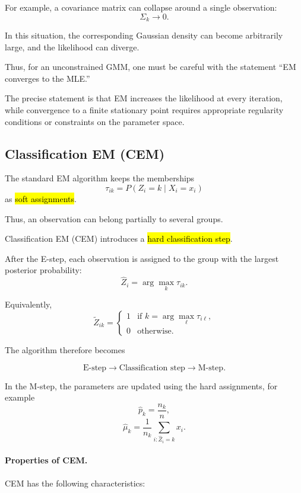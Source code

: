 For example, a covariance matrix can collapse around a single
observation:
\[
\Sigma_k\longrightarrow0.
\]

In this situation, the corresponding Gaussian density can become
arbitrarily large, and the likelihood can diverge.

Thus, for an unconstrained GMM, one must be careful with the statement
``EM converges to the MLE.''

The precise statement is that EM increases the likelihood at every
iteration, while convergence to a finite stationary point requires
appropriate regularity conditions or constraints on the parameter
space.

\subsection{Classification EM (CEM)}

The standard EM algorithm keeps the memberships
\[
\tau_{ik}
=
P(Z_i=k\mid X_i=x_i)
\]
as \hl{soft assignments}.

Thus, an observation can belong partially to several groups.

Classification EM (CEM) introduces a
\hl{hard classification step}.

After the E-step, each observation is assigned to the group with the
largest posterior probability:
\[
\hat Z_i
=
\arg\max_{k}
\tau_{ik}.
\]

Equivalently,
\[
\tilde Z_{ik}
=
\begin{cases}
1
&
\text{if }
k=\arg\max_{\ell}\tau_{i\ell},\\
0
&
\text{otherwise}.
\end{cases}
\]

The algorithm therefore becomes

\[
\boxed{
\text{E-step}
\longrightarrow
\text{Classification step}
\longrightarrow
\text{M-step}.
}
\]

In the M-step, the parameters are updated using the hard assignments,
for example
\[
\hat p_k=\frac{n_k}{n},
\]
\[
\hat\mu_k
=
\frac{1}{n_k}
\sum_{i:\hat Z_i=k}x_i.
\]

\paragraph{Properties of CEM.}

CEM has the following characteristics:

